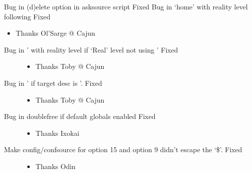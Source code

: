 \documentclass[letterpaper,10pt,english]{sphinxmanual}
\begin{document}
\sphinxAtStartPar
Bug in (d)elete option in asksource script \sphinxhyphen{} Fixed
Bug in ‘home’ with reality level following \sphinxhyphen{} Fixed
\begin{itemize}
\item {} 
\sphinxAtStartPar
Thanks Ol’Sarge @ Cajun

\end{itemize}
\begin{description}
\item[{Bug in ’ with reality level if ‘Real’ level not using ’ \sphinxhyphen{} Fixed}] \leavevmode\begin{itemize}
\item {} 
\sphinxAtStartPar
Thanks Toby @ Cajun

\end{itemize}

\item[{Bug in ’ if target desc is ’. \sphinxhyphen{} Fixed}] \leavevmode\begin{itemize}
\item {} 
\sphinxAtStartPar
Thanks Toby @ Cajun

\end{itemize}

\item[{Bug in double\sphinxhyphen{}free if default globals enabled \sphinxhyphen{} Fixed}] \leavevmode\begin{itemize}
\item {} 
\sphinxAtStartPar
Thanks Ixokai

\end{itemize}

\item[{Make config/confsource for option 15 and option 9 didn’t escape the ‘\$’. \sphinxhyphen{} Fixed}] \leavevmode\begin{itemize}
\item {} 
\sphinxAtStartPar
Thanks Odin

\end{itemize}

\end{description}
\end{document}
